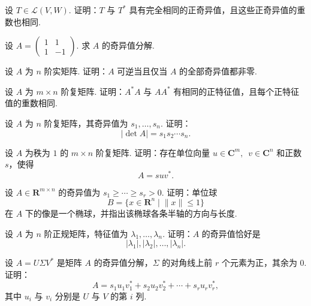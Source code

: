 \begin{exercise}

    \begin{exgroup}
        \item 设 $ T \in \mathcal{L}(V, W) $. 证明：$ T $ 与 $ T^* $ 具有完全相同的正奇异值，且这些正奇异值的重数也相同.

        \item 设 $ A = \begin{pmatrix}
            1 & 1 \\
            1 & -1
        \end{pmatrix} $. 求 $ A $ 的奇异值分解.

        \item 设 $ A $ 为 $ n $ 阶实矩阵. 证明：$ A $ 可逆当且仅当 $ A $ 的全部奇异值都非零.
    \end{exgroup}

    \begin{exgroup}
        \item 设 $ A $ 为 $ m \times n $ 阶复矩阵. 证明：$ A^*A $ 与 $ AA^* $ 有相同的正特征值，且每个正特征值的重数相同.

        \item 设 $ A $ 为 $ n $ 阶复矩阵，其奇异值为 $ s_1, \ldots, s_n $. 证明：
        \[
            |\det A| = s_1s_2\cdots s_n.
        \]

        \item 设 $ A $ 为秩为 $ 1 $ 的 $ m \times n $ 阶复矩阵. 证明：存在单位向量 $ u \in \mathbf{C}^m,\enspace v \in \mathbf{C}^n $ 和正数 $ s $，使得
            \[
                A = suv^*.
            \]
    \end{exgroup}

    \begin{exgroup}
        \item 设 $ A \in \mathbf{R}^{m \times n} $ 的奇异值为 $ s_1 \geqslant \cdots \geqslant s_r > 0 $. 证明：单位球
        \[
            B = \{x \in \mathbf{R}^n \mid \lVert x \rVert \leqslant 1\}
        \]
        在 $ A $ 下的像是一个椭球，并指出该椭球各条半轴的方向与长度.

        \item 设 $ A $ 为 $ n $ 阶正规矩阵，特征值为 $ \lambda_1, \ldots, \lambda_n $. 证明：$ A $ 的奇异值恰好是
        \[
            |\lambda_1|, |\lambda_2|, \ldots, |\lambda_n|.
        \]

        \item 设 $ A = U\Sigma V^* $ 是矩阵 $ A $ 的奇异值分解，$ \Sigma $ 的对角线上前 $ r $ 个元素为正，其余为 $ 0 $. 证明：
        \[
            A = s_1u_1v_1^* + s_2u_2v_2^* + \cdots + s_ru_rv_r^*,
        \]
        其中 $ u_i $ 与 $ v_i $ 分别是 $ U $ 与 $ V $ 的第 $ i $ 列.
    \end{exgroup}
\end{exercise}

